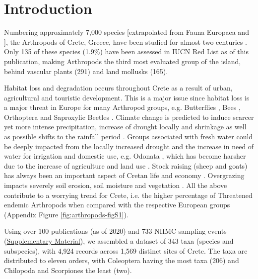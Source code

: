 \section{Introduction}
\label{sec:arthropods-intro}

Numbering approximately 7,000 species [extrapolated from Fauna Europaea
\parencite{jong2014fauna} and \textcite{legakis2018}], the Arthropods of Crete, Greece,
have been studied for almost two centuries \parencite{Anastasiou2018Tenebrionid}.
Only 135 of these species (1.9\%) have been assessed in IUCN Red List as of
this publication, making Arthropods the third most evaluated group of the
island, behind vascular plants (291) and land mollusks (165).

Habitat loss and degradation occurs throughout Crete as a result of urban,
agricultural and touristic development. This is a major issue since habitat
loss is a major threat in Europe for many Arthropod groups,
e.g. Butterflies \parencite{VanSwaaycommission2010european}, Bees \parencite{nieto2014},
Orthoptera \parencite{hochkirch2016} and Saproxylic Beetles \parencite{Calix_2018}.
Climate change is predicted to induce scarcer yet more intense precipitation,
increase of drought locally \parencite{koutroulis2011spatiotemporal} and shrinkage as well as
possible shifts to the rainfall period \parencite{koutroulis2013impact}. Groups
associated with fresh water could be deeply impacted from the locally increased
drought and the increase in need of water for irrigation and domestic use,
e.g. Odonata \parencite{kalkman2010}, which has become harsher due to the
increase of agriculture and land use \parencite{tzanakakis2020challenges}. Stock raising
(sheep and goats) has always been an important aspect of Cretan life and
economy \parencite{rackham1996the-making}. Overgrazing impacts severely soil erosion,
soil moisture and vegetation \parencite{kosmas2015exploring,orestis2015exploring}. All the
above contribute to a worrying trend for Crete, i.e. the higher percentage of
Threatened endemic Arthropods when compared with the respective European
groups (Appendix Figure \ref{fig:arthropods-figS1}).

Using over 100 publications (as of 2020) and 733 NHMC sampling events
(\href{https://doi.org/10.5281/zenodo.10635645}{Supplementary Material}), we assembled a dataset of 343 taxa (species and subspecies),
with 4,924 records across 1,569 distinct sites of Crete. The taxa
are distributed to eleven orders, with Coleoptera having the most taxa (206)
and Chilopoda and Scorpiones the least (two).


